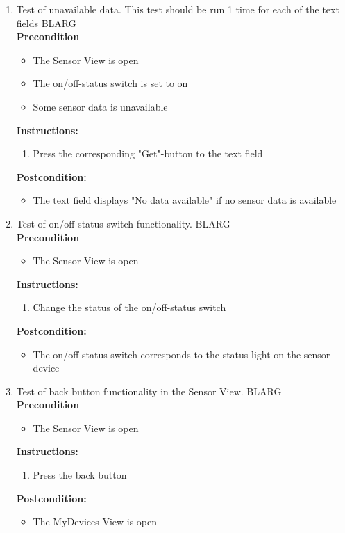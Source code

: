 \documentclass[a4paper]{article}
\newlength{\testlabellength}
\newenvironment{testlist}{\begin{enumerate}[label=\bfseries Instruction \thesubsection.\arabic* , labelindent=0pt, labelwidth=\testlabellength , leftmargin=2cm]}{\end{enumerate}}
\newenvironment{precondition}{
{\color{white}BLARG}\\ 
\textbf{Precondition}
\begin{itemize}[labelindent=0cm, labelwidth=2cm , leftmargin=1cm]
}
{\end{itemize}}
\newenvironment{instruction}{
\textbf{Instructions:}
\begin{enumerate}[label=\bfseries  \arabic*., labelindent=0cm, labelwidth=2cm , leftmargin=1cm]
}
{\end{enumerate}}
\newenvironment{postcondition}{
\textbf{Postcondition:}
\begin{itemize}[labelindent=0cm, labelwidth=2cm , leftmargin=1cm]
}
{\end{itemize}}
\begin{document}
\begin{appendices}
\begin{testlist}
	\item Test of unavailable data. \newline This test should be run 1 time for each of the text fields
		\begin{precondition}
			\item The Sensor View is open
			\item The on/off-status switch is set to on
			\item Some sensor data is unavailable
		\end{precondition}
		\begin{instruction}
			\item Press the corresponding "Get"-button to the text field
    	\end{instruction}
    	\begin{postcondition}
    		\item The text field displays "No data available" if no sensor data is available
    	\end{postcondition}

	\item Test of on/off-status switch functionality.
		\begin{precondition}
			\item The Sensor View is open
		\end{precondition}
		\begin{instruction}
			\item Change the status of the on/off-status switch
		\end{instruction}
		\begin{postcondition}
			\item The on/off-status switch corresponds to the status light on the sensor device
		\end{postcondition}


	\item Test of back button functionality in the Sensor View.
		\begin{precondition}
			\item The Sensor View is open
		\end{precondition}
		\begin{instruction}
			\item Press the back button
		\end{instruction}
		\begin{postcondition}
			\item The MyDevices View is open
		\end{postcondition}


\end{testlist}
\end{appendices}
\end{document}
